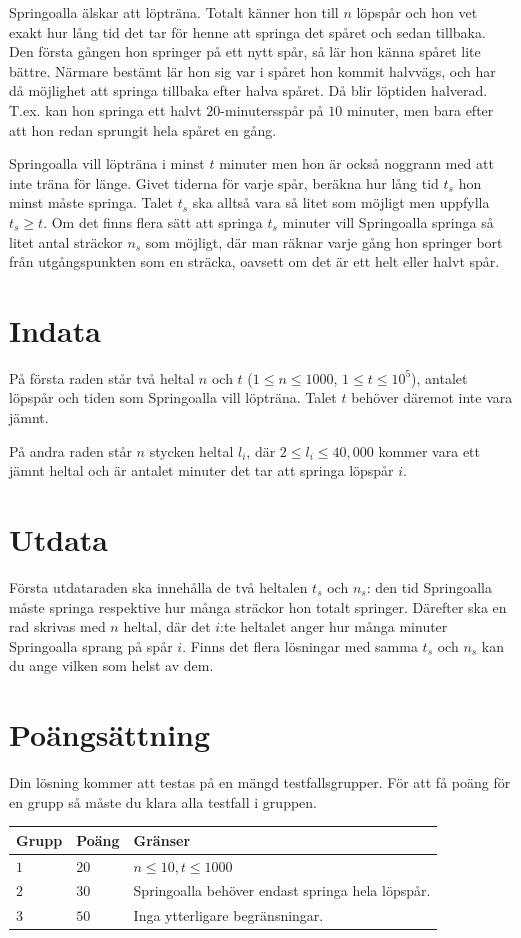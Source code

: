 Springoalla älskar att löpträna.
Totalt känner hon till $n$ löpspår och hon vet exakt hur lång tid det tar för henne att springa det spåret och sedan tillbaka.
Den första gången hon springer på ett nytt spår, så lär hon känna spåret lite bättre.
Närmare bestämt lär hon sig var i spåret hon kommit halvvägs, och har då möjlighet att springa tillbaka efter halva spåret.
Då blir löptiden halverad.
T.ex. kan hon springa ett halvt $20$-minutersspår på $10$ minuter, men bara efter att hon redan sprungit hela spåret en gång.

Springoalla vill löpträna i minst $t$ minuter men hon är också noggrann med att inte träna för länge.
Givet tiderna för varje spår, beräkna hur lång tid $t_s$ hon minst måste springa.
Talet $t_s$ ska alltså vara så litet som möjligt men uppfylla $t_s \ge t$.
Om det finns flera sätt att springa $t_s$ minuter vill Springoalla springa så litet antal sträckor $n_s$ som möjligt, där man räknar varje gång hon springer bort från utgångspunkten som en sträcka, oavsett om det är ett helt eller halvt spår.

\section*{Indata}
På första raden står två heltal $n$ och $t$ ($1 \leq n \leq 1000$, $1 \le t \le 10^5$), antalet löpspår och tiden som Springoalla vill löpträna.
Talet $t$ behöver däremot inte vara jämnt.

På andra raden står $n$ stycken heltal $l_i$, där $2 \le l_i \le 40{,}000$ kommer vara ett jämnt heltal och är antalet minuter det tar att springa löpspår $i$.

\section*{Utdata}
Första utdataraden ska innehålla de två heltalen $t_s$ och $n_s$: den tid Springoalla måste springa respektive hur många sträckor hon totalt springer.
Därefter ska en rad skrivas med $n$ heltal, där det $i$:te heltalet anger hur många minuter Springoalla sprang på spår $i$.
Finns det flera lösningar med samma $t_s$ och $n_s$ kan du ange vilken som helst av dem.

\section*{Poängsättning}
Din lösning kommer att testas på en mängd testfallsgrupper.
För att få poäng för en grupp så måste du klara alla testfall i gruppen.

\noindent
\begin{tabular}{| l | l | p{12cm} |}
  \hline
  \textbf{Grupp} & \textbf{Poäng} & \textbf{Gränser} \\ \hline
  $1$    & $20$        & $n \le 10, t \le 1000$ \\ \hline
  $2$    & $30$        & Springoalla behöver endast springa hela löpspår. \\ \hline
  $3$    & $50$        & Inga ytterligare begränsningar. \\ \hline 
\end{tabular}

